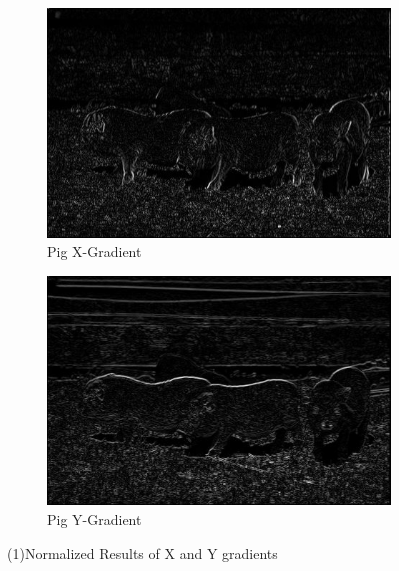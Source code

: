 \documentclass[12pt]{article}
\begin{document}
\begin{figure}[H]
	\begin{subfigure}{0.45\textwidth}
		\centering
		\includegraphics[width=\textwidth]{PigX.jpg}
		\caption{Pig X-Gradient}
		\label{fig:pig.x}
	\end{subfigure}
	\begin{subfigure}{0.45\textwidth}
		\centering
		\includegraphics[width=\textwidth]{PigY.jpg}
		\caption{Pig Y-Gradient}
		\label{fig:pig.y}
	\end{subfigure}
	\caption{(1)Normalized Results of X and Y gradients}
	\label{p1a1}
\end{figure}
\end{document}
